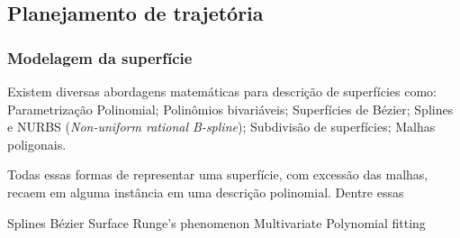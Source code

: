 \subsection{Planejamento de trajetória}

\subsubsection{Modelagem da superfície}\label{modelagem}

%





Existem diversas abordagens matemáticas para descrição de superfícies como:
Parametrização Polinomial; Polinômios bivariáveis; Superfícies de
Bézier; Splines e NURBS (\textit{Non-uniform rational B-spline}); Subdivisão de
superfícies; Malhas poligonais.

Todas essas formas de representar uma superfície, com excessão das malhas,
recaem em alguma instância em uma descrição polinomial. Dentre essas




Splines
Bézier Surface
Runge's phenomenon
Multivariate Polynomial fitting



